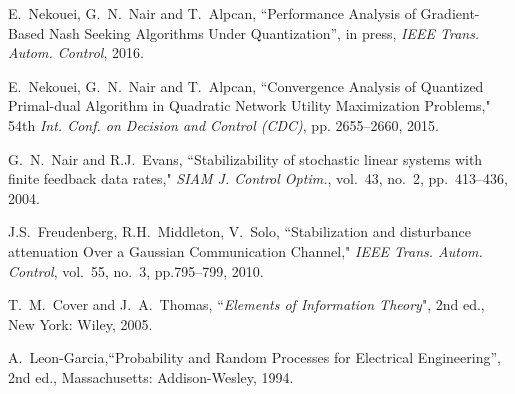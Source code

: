 \documentclass[10pt,twocolumn,twoside]{IEEEtran}
\begin{document}
\begin{thebibliography}{1}
E.~Nekouei, G.~N.~Nair and T.~Alpcan, ``Performance Analysis of Gradient-Based Nash Seeking Algorithms Under Quantization'', in press, \emph{IEEE Trans. Autom. Control}, 2016.

E.~Nekouei, G.~N.~Nair and T.~Alpcan, ``Convergence Analysis of Quantized Primal-dual Algorithm in Quadratic Network Utility Maximization Problems," 54th \emph{Int. Conf. on Decision and Control (CDC)}, pp. 2655--2660, 2015.

G.~N.~Nair and R.J.~Evans, ``Stabilizability of stochastic linear systems with finite feedback data rates," \emph{SIAM J. Control Optim.}, vol.~43, no.~2, pp.~413--436, 2004.

J.S.~Freudenberg, R.H.~Middleton, V.~Solo, ``Stabilization and disturbance attenuation Over a Gaussian Communication Channel," \emph{IEEE Trans. Autom. Control}, vol.~55, no.~3, pp.795--799,  2010.

T.~M.~Cover and J.~A.~Thomas, ``\emph{Elements of Information Theory}", 2nd ed., New York: Wiley, 2005.

A.~Leon-Garcia,``Probability and Random Processes for Electrical Engineering'', 2nd ed., Massachusetts: Addison-Wesley, 1994.

 \end{thebibliography}
\end{document}
